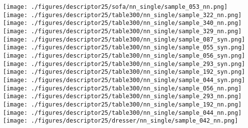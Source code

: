 \documentclass[10pt,twocolumn,letterpaper]{article}
\begin{document}
\begin{figure*}[h]
      \texttt{[image: ./figures/descriptor25/sofa/nn\_single/sample\_053\_nn.png]}           \hspace{-1mm}     
      \\
      \texttt{[image: ./figures/descriptor25/table300/nn\_single/sample\_322\_nn.png]}           \hspace{-1mm} 
      \texttt{[image: ./figures/descriptor25/table300/nn\_single/sample\_340\_nn.png]}           \hspace{-1mm} 
       \texttt{[image: ./figures/descriptor25/table300/nn\_single/sample\_329\_nn.png]}           
      \texttt{[image: ./figures/descriptor25/table300/nn\_single/sample\_087\_syn.png]}           \hspace{-1mm} 
     \texttt{[image: ./figures/descriptor25/table300/nn\_single/sample\_055\_syn.png]}           \hspace{-1mm} 
     \texttt{[image: ./figures/descriptor25/table300/nn\_single/sample\_056\_syn.png]}           \hspace{-1mm} 
      \texttt{[image: ./figures/descriptor25/table300/nn\_single/sample\_293\_syn.png]}           \hspace{-1mm} 
      \texttt{[image: ./figures/descriptor25/table300/nn\_single/sample\_192\_syn.png]}           \hspace{-1mm} 
     \texttt{[image: ./figures/descriptor25/table300/nn\_single/sample\_044\_syn.png]}                
      \texttt{[image: ./figures/descriptor25/table300/nn\_single/sample\_056\_nn.png]}           \hspace{-1mm} 
      \texttt{[image: ./figures/descriptor25/table300/nn\_single/sample\_293\_nn.png]}           \hspace{-1mm} 
     \texttt{[image: ./figures/descriptor25/table300/nn\_single/sample\_192\_nn.png]}           \hspace{-1mm} 
    \texttt{[image: ./figures/descriptor25/table300/nn\_single/sample\_044\_nn.png]}           \\
    \texttt{[image: ./figures/descriptor25/dresser/nn\_single/sample\_042\_nn.png]}          \hspace{-1mm}  

\end{figure*}
\end{document}
